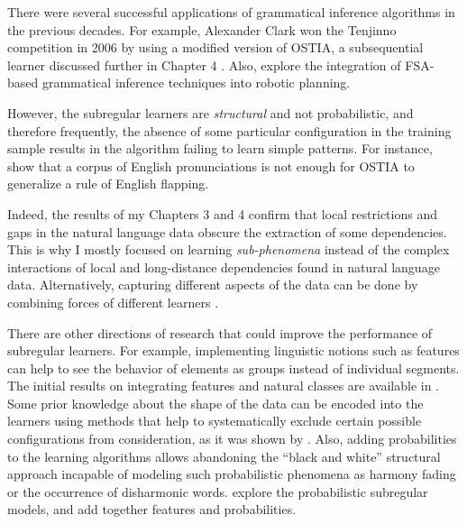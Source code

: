 There were several successful applications of grammatical inference algorithms in the previous decades.
For example, Alexander Clark won the Tenjinno competition in 2006 by using a modified version of OSTIA, a subsequential learner discussed further in Chapter 4 \citep{OncinaEtAl1993,Clark2006}.
Also, \cite{Chandlee-FuEtAl-2012-IGIRP} explore the integration of FSA-based grammatical inference techniques into robotic planning.


However, the subregular learners are \emph{structural} and not probabilistic, and therefore frequently, the absence of some particular configuration in the training sample results in the algorithm failing to learn simple patterns.
For instance, \cite{GildeaJurafsky1996} show that a corpus of English pronunciations is not enough for OSTIA to generalize a rule of English flapping.


Indeed, the results of my Chapters 3 and 4 confirm that local restrictions and gaps in the natural language data obscure the extraction of some dependencies.
This is why I mostly focused on learning \emph{sub-phenomena} instead of the complex interactions of local and long-distance dependencies found in natural language data.
Alternatively, capturing different aspects of the data can be done by combining forces of different learners \citep{Heinz10ldp,HeinzIdsardi13}.


There are other directions of research that could improve the performance of subregular learners.
For example, implementing linguistic notions such as features can help to see the behavior of elements as groups instead of individual segments.
The initial results on integrating features and natural classes are available in \citep{Strother-Garcia-HeinzEtAl-2016-UMTGICSP,chandlee-etal-2019-learning}.
Some prior knowledge about the shape of the data can be encoded into the learners using methods that help to systematically exclude certain possible configurations from consideration, as it was shown by \cite{WellmanHenrion1993}.
Also, adding probabilities to the learning algorithms allows abandoning the ``black and white'' structural approach incapable of modeling such probabilistic phenomena as harmony fading or the occurrence of disharmonic words.
\cite{HeinzRogers2010SPdist,Shibata-Heinz-2019-MLEFRDSL} explore the probabilistic subregular models, and \cite{Heinz-Koirala-2010-MLEFD,VuZehfrooshEtal2018-SRLUSM} add together features and probabilities.

